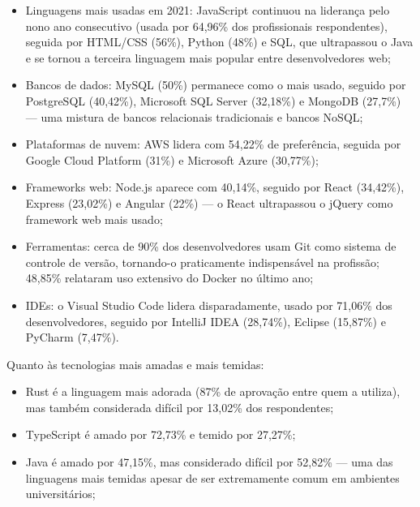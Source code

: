 \begin{itemize}
  \item Linguagens mais usadas em 2021: JavaScript continuou na liderança pelo nono ano consecutivo (usada por 64,96\% dos profissionais respondentes), seguida por HTML/CSS (56\%), Python (48\%) e SQL, que ultrapassou o Java e se tornou a terceira linguagem mais popular entre desenvolvedores web;
  \item Bancos de dados: MySQL (50\%) permanece como o mais usado, seguido por PostgreSQL (40,42\%), Microsoft SQL Server (32,18\%) e MongoDB (27,7\%) — uma mistura de bancos relacionais tradicionais e bancos NoSQL;
  \item Plataformas de nuvem: AWS lidera com 54,22\% de preferência, seguida por Google Cloud Platform (31\%) e Microsoft Azure (30,77\%);
  \item Frameworks web: Node.js aparece com 40,14\%, seguido por React (34,42\%), Express (23,02\%) e Angular (22\%) — o React ultrapassou o jQuery como framework web mais usado;
\end{itemize}

\begin{itemize}
  \item Ferramentas: cerca de 90\% dos desenvolvedores usam Git como sistema de controle de versão, tornando-o praticamente indispensável na profissão; 48,85\% relataram uso extensivo do Docker no último ano;
\end{itemize}

\begin{itemize}
  \item IDEs: o Visual Studio Code lidera disparadamente, usado por 71,06\% dos desenvolvedores, seguido por IntelliJ IDEA (28,74\%), Eclipse (15,87\%) e PyCharm (7,47\%).
\end{itemize}

Quanto às tecnologias mais amadas e mais temidas:

\begin{itemize}
  \item Rust é a linguagem mais adorada (87\% de aprovação entre quem a utiliza), mas também considerada difícil por 13,02\% dos respondentes;
\end{itemize}

\begin{itemize}
  \item TypeScript é amado por 72,73\% e temido por 27,27\%;
\end{itemize}

\begin{itemize}
  \item Java é amado por 47,15\%, mas considerado difícil por 52,82\% — uma das linguagens mais temidas apesar de ser extremamente comum em ambientes universitários;
\end{itemize}

